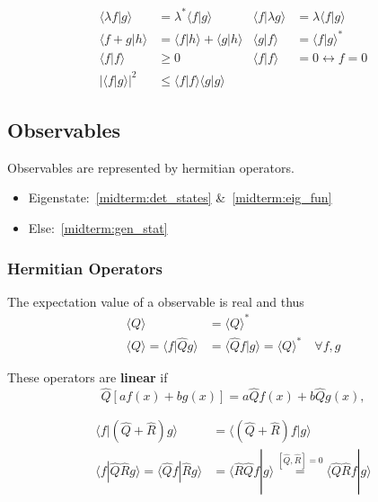 \noindent\begin{align*}
    \langle \lambda f|g \rangle & =\lambda^* \langle f|g \rangle               & \langle f|\lambda g \rangle & =\lambda \langle f|g \rangle \\
    \langle f+g|h \rangle       & =\langle f|h \rangle + \langle g|h \rangle   & \langle g|f \rangle         & = {\langle f|g \rangle}^*    \\
    \langle f|f \rangle         & \ge 0                                        & \langle f|f \rangle         & = 0 \leftrightarrow f=0      \\
    |\langle f|g \rangle |^2    & \leq \langle f|f \rangle \langle g|g \rangle
\end{align*}

\subsection{Observables}
Observables are represented by hermitian operators.
\begin{itemize}
    \item Eigenstate:\ \ref{midterm:det_states} \&\ \ref{midterm:eig_fun}
    \item Else:\ \ref{midterm:gen_stat}
\end{itemize}

\subsubsection{Hermitian Operators}
The expectation value of a observable is real and thus
\noindent\begin{align*}
    \langle Q\rangle                            & = {\langle Q\rangle}^*                                            \\
    \langle Q\rangle=\langle f|\hat{Q} g\rangle & = \langle \hat{Q}f|g\rangle={\langle Q\rangle}^*\quad \forall f,g
\end{align*}

These operators are \textbf{linear} if
\noindent\begin{equation*}
    \hat{Q}\left[af(x)+bg(x)\right]=a\hat{Q}f(x)+b\hat{Q}g(x),
\end{equation*}


\noindent\begin{align*}
    \langle f|(\hat{Q} + \hat{R})g\rangle                                    & = \langle (\hat{Q} + \hat{R})f|g\rangle                                                               \\[0.75em]
    \langle f|\hat{Q}\hat{R}g\rangle       =\langle \hat{Q}f|\hat{R}g\rangle & =  \langle \hat{R}\hat{Q}f|g\rangle \overset{[\hat{Q},\hat{R}]=0}{=} \langle \hat{Q}\hat{R}f|g\rangle
\end{align*}

